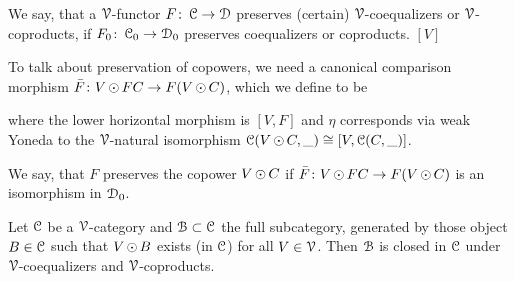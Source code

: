 \documentclass[a4paper,11pt,oneside,openany]{scrbook}
\begin{document}
\begin{defn}
   We say, that a $\V$-functor $F \from \C \to \D$ preserves (certain) $\V$-coequalizers or $\V$-coproducts, if $F_{0} \from \C_{0} \to \D_{0}$ preserves
   coequalizers or coproducts. $[V]$
\end{defn}

To talk about preservation of copowers, we need a canonical comparison morphism $\bar{F} \from V\copw FC \to F(V\copw C)$, which we define to be 
   \begin{center}
   \end{center}
where the lower horizontal morphism is $[V,F]$ and $\eta$ corresponds via weak Yoneda to the $\V$-natural isomorphism $\C(V\copw C,\_) \iso [V,\C(C,\_)]$.

\begin{defn}
   We say, that $F$ preserves the copower $V \copw C$ if $\bar{F} \from V \copw FC \to F(V \copw C)$ is an isomorphism in $\D_{0}$.
\end{defn}

\begin{lemma}
   Let $\C$ be a $\V$-category and $\B \subset \C$ the full subcategory, generated by those object $B \in \C$ such that $V \copw B$ exists (in $\C$) for all
   $V \in \V$. Then $\B$ is closed in $\C$ under $\V$-coequalizers and $\V$-coproducts.
\end{lemma}
\end{document}

